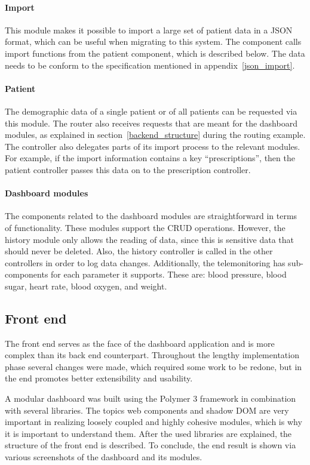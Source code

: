             \paragraph{Import} This module makes it possible to import a large set of patient data in a JSON format, which can be useful when migrating to this system. The component calls import functions from the patient component, which is described below. The data needs to be conform to the specification mentioned in appendix~\ref{json_import}.

            \paragraph{Patient} The demographic data of a single patient or of all patients can be requested via this module. The router also receives requests that are meant for the dashboard modules, as explained in section~\ref{backend_structure} during the routing example. The controller also delegates parts of its import process to the relevant modules. For example, if the import information contains a key ``prescriptions'', then the patient controller passes this data on to the prescription controller.

            \paragraph{Dashboard modules} The components related to the dashboard modules are straightforward in terms of functionality. These modules support the CRUD operations. However, the history module only allows the reading of data, since this is sensitive data that should never be deleted. Also, the history controller is called in the other controllers in order to log data changes. Additionally, the telemonitoring has sub-components for each parameter it supports. These are: blood pressure, blood sugar, heart rate, blood oxygen, and weight.

    \subsection{Front end}

    The front end serves as the face of the dashboard application and is more complex than its back end counterpart. Throughout the lengthy implementation phase several changes were made, which required some work to be redone, but in the end promotes better extensibility and usability. 
    
    A modular dashboard was built using the Polymer 3 framework in combination with several libraries. The topics web components and shadow DOM are very important in realizing loosely coupled and highly cohesive modules, which is why it is important to understand them. After the used libraries are explained, the structure of the front end is described. To conclude, the end result is shown via various screenshots of the dashboard and its modules.

